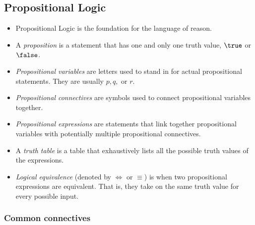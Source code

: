 \hypertarget{propositional-logic}{%
\subsection{Propositional Logic}\label{propositional-logic}}

\begin{itemize}
\tightlist
\item
  Propositional Logic is the foundation for the language of reason.
\item
  A \emph{proposition} is a statement that has one and only one truth
  value, \(\true\) or \(\false\).
\item
  \emph{Propositional variables} are letters used to stand in for actual
  propositional statements. They are usually \(p, q,\) or \(r\).
\item
  \emph{Propositional connectives} are symbols used to connect
  propositional variables together.
\item
  \emph{Propositional expressions} are statements that link together
  propositional variables with potentially multiple propositional
  connectives.
\item
  A \emph{truth table} is a table that exhaustively lists all the
  possible truth values of the expressions.
\item
  \emph{Logical equivalence} (denoted by \(\iff\) or \(\equiv\)) is when
  two propositional expressions are equivalent. That is, they take on
  the same truth value for every possible input.
\end{itemize}

\hypertarget{common-connectives}{%
\subsubsection{Common connectives}\label{common-connectives}}

